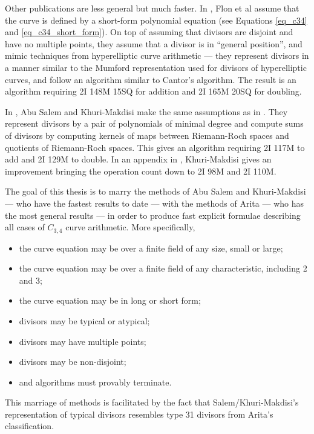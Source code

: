 Other publications are less general but much faster.
In \cite{flon08}, Flon et al assume that the curve is defined by a short-form polynomial equation
(see Equations \ref{eq_c34} and \ref{eq_c34_short_form}).
On top of assuming that divisors are disjoint and have no multiple points, 
they assume that a divisor is in ``general position'', and mimic techniques from hyperelliptic curve arithmetic ---
they represent divisors in a manner similar to the Mumford representation used for divisors of hyperelliptic curves,
and follow an algorithm similar to Cantor's algorithm.
The result is an algorithm requiring 2I 148M 15SQ for addition and 2I 165M 20SQ for doubling.

In \cite{salem07}, Abu Salem and Khuri-Makdisi make the same assumptions as in \cite{flon08}.
They represent divisors by a pair of polynomials of minimal degree and compute sums of divisors
by computing kernels of maps between Riemann-Roch spaces and quotients of Riemann-Roch spaces.
This gives an algorithm requiring 2I 117M to add and 2I 129M to double.
In an appendix in \cite{makdisi18}, Khuri-Makdisi gives an improvement bringing the operation count down to 2I 98M and 2I 110M.

The goal of this thesis is to marry the methods of Abu Salem and Khuri-Makdisi --- who have the fastest results to date ---
with the methods of Arita --- who has the most general results ---
in order to produce fast explicit formulae describing all cases of $C_{3,4}$ curve arithmetic.
More specifically,
\begin{itemize}
  \item the curve equation may be over a finite field of any size, small or large;
  \item the curve equation may be over a finite field of any characteristic, including 2 and 3;
  \item the curve equation may be in long or short form;
  \item divisors may be typical or atypical;
  \item divisors may have multiple points;
  \item divisors may be non-disjoint;
  \item and algorithms must provably terminate.
\end{itemize}
This marriage of methods is facilitated by the fact that Salem/Khuri-Makdisi's representation of typical divisors resembles type 31 divisors from Arita's classification.


